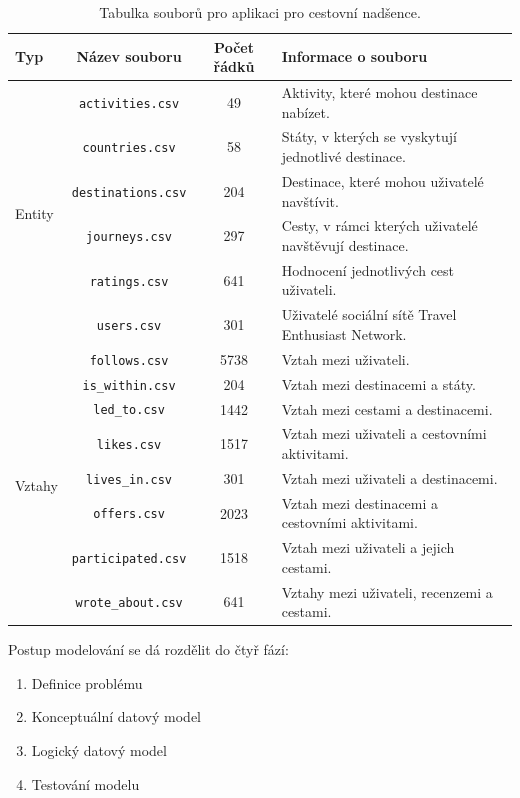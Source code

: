 \documentclass[
  program=infoi,
  biblatex=true,
  sourcecodes=true,
  figures=true,
  glossaries=false,
  index
]{kidiplom}
\begin{document}
\begin{table}[h]
\caption{Tabulka souborů pro aplikaci pro cestovní nadšence.}
\label{tab:TravelEnthusiastNetwork-csv}
\begin{tabularx}{\textwidth}{ | l | c | c | X | }
 \hline
 \textbf{Typ} & \textbf{Název souboru} & \textbf{Počet řádků} & \textbf{Informace o souboru} \\
 \hline \hline
 \multirow{6}{*}{Entity} & \texttt{activities.csv} & 49 & Aktivity, které mohou destinace nabízet. \\
 & \texttt{countries.csv} & 58 & Státy, v kterých se vyskytují jednotlivé destinace.\\
 & \texttt{destinations.csv} & 204 & Destinace, které mohou uživatelé navštívit. \\
 & \texttt{journeys.csv} & 297 & Cesty, v rámci kterých uživatelé navštěvují destinace. \\
 & \texttt{ratings.csv} & 641 & Hodnocení jednotlivých cest uživateli.\\
 & \texttt{users.csv} & 301 & Uživatelé sociální sítě Travel Enthusiast Network.\\
 \hline
 \multirow{8}{*}{Vztahy} & \texttt{follows.csv} & 5738 & Vztah mezi uživateli. \\
 & \texttt{is\_within.csv} & 204 & Vztah mezi destinacemi a státy. \\
 & \texttt{led\_to.csv} & 1442 & Vztah mezi cestami a destinacemi.\\
 & \texttt{likes.csv} & 1517 & Vztah mezi uživateli a cestovními aktivitami. \\
 & \texttt{lives\_in.csv} & 301 & Vztah mezi uživateli a destinacemi.\\
 & \texttt{offers.csv} & 2023 & Vztah mezi destinacemi a cestovními aktivitami.\\
 & \texttt{participated.csv} & 1518 & Vztah mezi uživateli a jejich cestami. \\
 & \texttt{wrote\_about.csv} & 641 & Vztahy mezi uživateli, recenzemi a cestami. \\
 \hline
\end{tabularx}
\end{table}

Postup modelování se dá rozdělit do čtyř fází:
\begin{enumerate}
  \item Definice problému
  \item Konceptuální datový model
  \item Logický datový model
  \item Testování modelu 
\end{enumerate}
\end{document}
